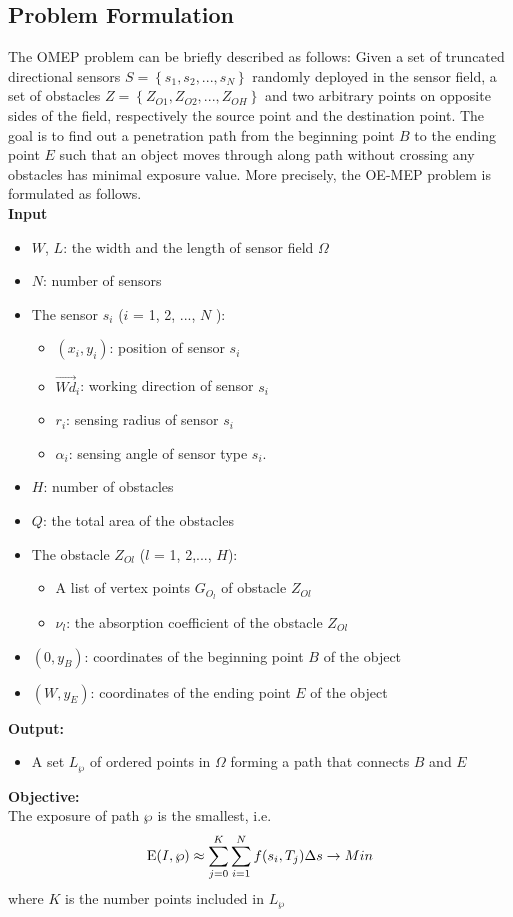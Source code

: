 \documentclass[final]{elsarticle}
\begin{document}
\subsection{Problem Formulation}
The OMEP problem can be briefly described as follows: Given a set of truncated directional sensors $S = \left\{ {{s_1},{s_2},...,{s_N}} \right\}$ randomly deployed in the sensor field, a set of obstacles $Z = \left\{ {{Z_{O1}},{Z_{O2}},...,{Z_{OH}}} \right\}$ and two arbitrary points on opposite sides of the field, respectively the source point and the destination point. The goal is to find out a penetration path from the beginning point $B$ to the ending point $E$ such that an object moves through along path without crossing any obstacles has minimal exposure value. More precisely, the OE-MEP problem is formulated as follows.\\
\textbf{Input}
\begin{itemize}
		\itemsep-0.2em
		\item $W$, $L$: the width and the length of sensor field $\Omega$
		\item $N$: number of sensors
		\item The sensor $s_i$ ($ i $ = 1, 2, ..., $ N $ ):
		\begin{itemize}
			 \item $({x_i},y_i)$: position of sensor $ s_i $
			 \item $\overrightarrow{Wd}_i$: working direction of sensor $s_i$
			 \item $ r_i $: sensing radius of sensor $ s_i $
			 \item ${\alpha _i}$: sensing angle of sensor type $ s_i $.
		 \end{itemize}
		 \item $H$: number of obstacles
		 \item $Q$: the total area of the obstacles 
		 \item The obstacle $Z_{Ol}$ ($ l $ = 1, 2,..., $H$): 
		 \begin{itemize}
		 	\item A list of vertex points $ G_{O_l} $ of obstacle $Z_{Ol}$
		 	\item $ \nu_l $: the absorption coefficient of the obstacle $Z_{Ol}$
		 \end{itemize}
		\item $(0, y_B)$: coordinates of the beginning point $B$ of the object
		\item $(W, y_E)$: coordinates of the ending point $E$ of the object
\end{itemize}
\textbf{Output:}
\begin{itemize}
	\item A set ${L_\wp }$ of ordered points in $\Omega $ forming a path that connects $ B $ and $ E $ 
\end{itemize}
\textbf{Objective:}\\
The exposure of path  $\wp $ is the smallest, i.e.
\begin{equation}
\label{eq9}
{\rm E}(I,\wp )  \approx \sum\limits_{j = 0}^K {\sum\limits_{i = 1}^N {f({s_i},{T_j})} } \Delta s  \to Min
\end{equation}
where $ K $ is the number points included in ${L_\wp }$
\end{document}
